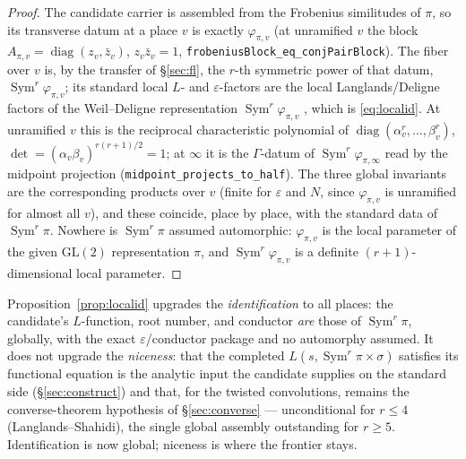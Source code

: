 \documentclass[11pt]{article}
\theoremstyle{definition}
\newcommand{\Sym}{\operatorname{Sym}}
\begin{document}
\begin{proof}
The candidate carrier is assembled from the Frobenius similitudes of $\pi$, so its transverse datum at a
place $v$ is exactly $\varphi_{\pi,v}$ (at unramified $v$ the block $A_{\pi,v}=\operatorname{diag}(z_v,
\bar z_v)$, $z_v\bar z_v=1$, \texttt{frobeniusBlock\_eq\_conjPairBlock}). The fiber over $v$ is, by the
transfer of \S\ref{sec:fl}, the $r$-th symmetric power of that datum, $\Sym^r\varphi_{\pi,v}$; its
standard local $L$- and $\varepsilon$-factors are the local Langlands/Deligne factors of the
Weil--Deligne representation $\Sym^r\varphi_{\pi,v}$ \cite{Tate}, which is \eqref{eq:localid}. At
unramified $v$ this is the reciprocal characteristic polynomial of
$\operatorname{diag}(\alpha_v^{r},\dots,\beta_v^{r})$, $\det=(\alpha_v\beta_v)^{r(r+1)/2}=1$; at $\infty$
it is the $\Gamma$-datum of $\Sym^r\varphi_{\pi,\infty}$ read by the midpoint projection
(\texttt{midpoint\_projects\_to\_half}). The three global invariants are the corresponding products over
$v$ (finite for $\varepsilon$ and $N$, since $\varphi_{\pi,v}$ is unramified for almost all $v$), and
these coincide, place by place, with the standard data of $\Sym^r\pi$. Nowhere is $\Sym^r\pi$ assumed
automorphic: $\varphi_{\pi,v}$ is the local parameter of the given $\mathrm{GL}(2)$ representation $\pi$,
and $\Sym^r\varphi_{\pi,v}$ is a definite $(r{+}1)$-dimensional local parameter.
\end{proof}

Proposition~\ref{prop:localid} upgrades the \emph{identification} to all places: the candidate's
$L$-function, root number, and conductor \emph{are} those of $\Sym^r\pi$, globally, with the exact
$\varepsilon$/conductor package and no automorphy assumed. It does not upgrade the \emph{niceness}: that
the completed $L(s,\Sym^r\pi\times\sigma)$ satisfies its functional equation is the analytic input the
candidate supplies on the standard side (\S\ref{sec:construct}) and that, for the twisted convolutions,
remains the converse-theorem hypothesis of \S\ref{sec:converse} --- unconditional for $r\le4$
(Langlands--Shahidi), the single global assembly outstanding for $r\ge5$. Identification is now global;
niceness is where the frontier stays.
\end{document}
